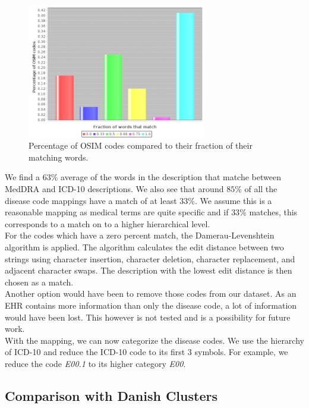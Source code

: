 \begin{figure}[!htb]
	\centering
	\includegraphics[width=0.7\textwidth]{mappingStats.jpeg}
	\caption{Percentage of OSIM codes compared to their fraction of their matching words.}
	\label{fig:mappingStats}
\end{figure}

We find a $63$\% average of the words in the description that matche between MedDRA and ICD-10 descriptions. We also see that around $85$\% of all the disease code mappings have a match of at least $33$\%. We assume this is a reasonable mapping as medical terms are quite specific and if $33$\% matches, this corresponds to a match on to a higher hierarchical level. \\
For the codes which have a zero percent match, the Damerau-Levenshtein algorithm \cite{edit:article} is applied. The algorithm calculates the edit distance between two strings using character insertion, character deletion, character replacement, and adjacent character swaps. The description with the lowest edit distance is then chosen as a match. \\
Another option would have been to remove those codes from our dataset. As an EHR contains more information than only the disease code, a lot of information would have been lost. This however is not tested and is a possibility for future work. \\

With the mapping, we can now categorize the disease codes. We use the hierarchy of ICD-10 and reduce the ICD-10 code to its first $3$ symbols. For example, we reduce the code \textit{E00.1} to its higher category \textit{E00}.


\subsection{Comparison with Danish Clusters}
\label{sec:clusterExp}

